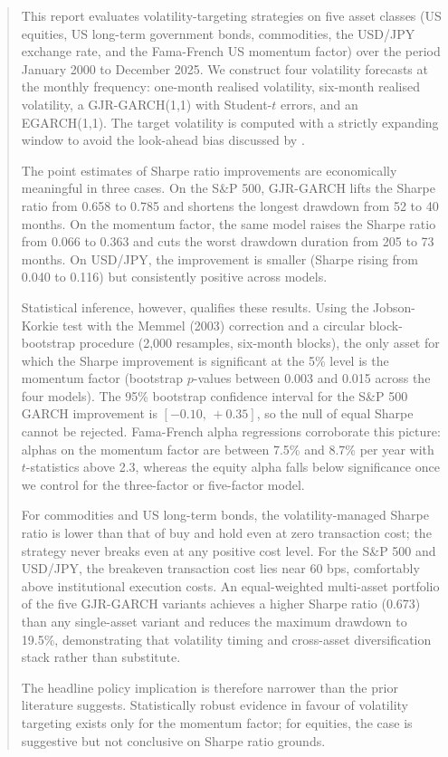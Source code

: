 \documentclass[12pt, a4paper]{article}
\begin{document}
\begin{abstract}
\noindent
This report evaluates volatility-targeting strategies on five asset classes (US equities,
US long-term government bonds, commodities, the USD/JPY exchange rate, and the
Fama-French US momentum factor) over the period January 2000 to December 2025. We construct
four volatility forecasts at the monthly frequency: one-month realised volatility, six-month
realised volatility, a GJR-GARCH(1,1) with Student-$t$ errors, and an EGARCH(1,1). The
target volatility is computed with a strictly expanding window to avoid the look-ahead bias
discussed by \citet{Bongaerts2020}.

The point estimates of Sharpe ratio improvements are economically meaningful in three cases.
On the S\&P 500, GJR-GARCH lifts the Sharpe ratio from 0.658 to 0.785 and shortens the
longest drawdown from 52 to 40 months. On the momentum factor, the same model raises the
Sharpe ratio from 0.066 to 0.363 and cuts the worst drawdown duration from 205 to 73 months.
On USD/JPY, the improvement is smaller (Sharpe rising from 0.040 to 0.116) but consistently
positive across models.

Statistical inference, however, qualifies these results. Using the Jobson-Korkie test with
the Memmel (2003) correction and a circular block-bootstrap procedure (2,000 resamples,
six-month blocks), the only asset for which the Sharpe improvement is significant at the
5\% level is the momentum factor (bootstrap $p$-values between 0.003 and 0.015 across the
four models). The 95\% bootstrap confidence interval for the S\&P 500 GARCH improvement is
$[-0.10,\, +0.35]$, so the null of equal Sharpe cannot be rejected. Fama-French alpha
regressions corroborate this picture: alphas on the momentum factor are between 7.5\% and
8.7\% per year with $t$-statistics above 2.3, whereas the equity alpha falls below
significance once we control for the three-factor or five-factor model.

For commodities and US long-term bonds, the volatility-managed Sharpe ratio is lower
than that of buy and hold even at zero transaction cost; the strategy never breaks even at
any positive cost level. For the S\&P 500 and USD/JPY, the breakeven transaction cost lies
near 60 bps, comfortably above institutional execution costs. An equal-weighted multi-asset
portfolio of the five GJR-GARCH variants achieves a higher Sharpe ratio (0.673) than any
single-asset variant and reduces the maximum drawdown to 19.5\%, demonstrating that
volatility timing and cross-asset diversification stack rather than substitute.

The headline policy implication is therefore narrower than the prior literature suggests.
Statistically robust evidence in favour of volatility targeting exists only for the
momentum factor; for equities, the case is suggestive but not conclusive on Sharpe ratio
grounds.
\end{abstract}
\end{document}
